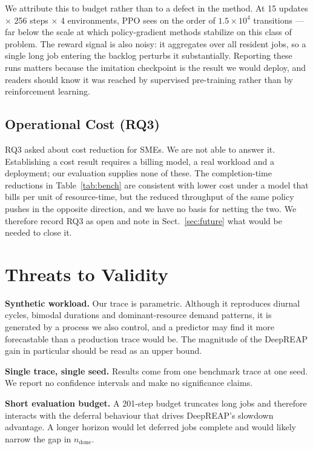 \documentclass[runningheads]{llncs}
\begin{document}
We attribute this to budget rather than to a defect in the method. At
15 updates $\times$ 256 steps $\times$ 4 environments, PPO sees on the
order of $1.5 \times 10^4$ transitions --- far below the scale at which
policy-gradient methods stabilize on this class of problem. The
reward signal is also noisy: it aggregates over all resident jobs, so
a single long job entering the backlog perturbs it substantially.
Reporting these runs matters because the imitation checkpoint is the
result we would deploy, and readers should know it was reached by
supervised pre-training rather than by reinforcement learning.

\subsection{Operational Cost (RQ3)}

RQ3 asked about cost reduction for SMEs. We are not able to answer it.
Establishing a cost result requires a billing model, a real workload
and a deployment; our evaluation supplies none of these. The
completion-time reductions in Table~\ref{tab:bench} are consistent
with lower cost under a model that bills per unit of resource-time,
but the reduced throughput of the same policy pushes in the opposite
direction, and we have no basis for netting the two. We therefore
record RQ3 as open and note in Sect.~\ref{sec:future} what would be
needed to close it.

\section{Threats to Validity}

\textbf{Synthetic workload.} Our trace is parametric. Although it
reproduces diurnal cycles, bimodal durations and dominant-resource
demand patterns, it is generated by a process we also control, and a
predictor may find it more forecastable than a production trace would
be. The magnitude of the DeepREAP gain in particular should be read as
an upper bound.

\textbf{Single trace, single seed.} Results come from one benchmark
trace at one seed. We report no confidence intervals and make no
significance claims.

\textbf{Short evaluation budget.} A 201-step budget truncates long
jobs and therefore interacts with the deferral behaviour that drives
DeepREAP's slowdown advantage. A longer horizon would let deferred
jobs complete and would likely narrow the gap in $n_{\text{done}}$.
\end{document}
